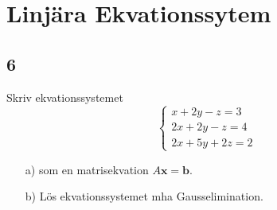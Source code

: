 \documentclass{article}
\begin{document}
\section*{Linjära Ekvationssytem}
\subsection*{6}
Skriv ekvationssystemet 
\begin{equation}
    \begin{cases}
                    x+2y-z=3 \\
                    2x+2y-z=4 \\
                    2x+5y+2z=2
    \end{cases}
\end{equation} 
\noindent
\begin{itemize}
    \item[a) ] som en matrisekvation $A \mathbf{x} = \mathbf{b}$.
    \item[b) ] Lös ekvationssystemet mha Gausselimination.
\end{itemize}
\end{document}
